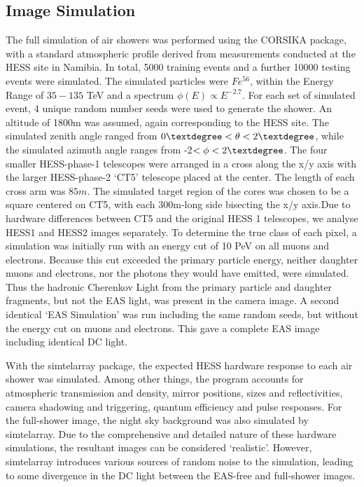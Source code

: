 \documentclass{article}
\begin{document}
\subsection{Image Simulation}
The full simulation of air showers was performed using the CORSIKA package, with a standard atmospheric profile derived from measurements conducted at the HESS site in Namibia. In total, 5000 training events and a further 10000 testing events were simulated. The simulated particles were $Fe^{56}$, within the Energy Range of $35-135$ TeV and a spectrum $\phi(E) \propto E^{-2.7}$. For each set of simulated event, 4 unique random number seeds were used to generate the shower. An altitude of 1800m was assumed, again corresponding to the HESS site. The simulated zenith angle ranged from $0\textdegree < \theta < 2 \textdegree$, while the simulated azimuth angle ranges from -2\textdegree $ < \phi < 2 \textdegree$. The four smaller HESS-phase-1 telescopes were arranged in a cross along the x/y axis with the larger HESS-phase-2 \textquoteleft CT5' telescope placed at the center. The length of each cross arm was $85m$. The simulated target region of the cores was chosen to be a square centered on CT5, with each 300m-long side bisecting the x/y axis.Due to hardware differences between CT5 and the original HESS 1 telescopes, we analyse HESS1 and HESS2 images separately. To determine the true class of each pixel, a simulation was initially run with an energy cut of 10 PeV on all muons and electrons. Because this cut exceeded the primary particle energy, neither daughter muons and electrons, nor the photons they would have emitted, were simulated. Thus the hadronic Cherenkov Light from the primary particle and daughter fragments, but not the EAS light, was present in the camera image. A second identical \textquoteleft EAS Simulation' was run including the same random seeds, but without the energy cut on muons and electrons. This gave a complete EAS image including identical DC light.

With the sim\textunderscore telarray package, the expected HESS hardware response to each air shower was simulated. Among other things, the program accounts for atmospheric transmission and density, mirror positions, sizes and reflectivities, camera shadowing and triggering, quantum efficiency and pulse responses. For the full-shower image, the night sky background was also simulated by sim\textunderscore telarray. Due to the comprehensive and detailed nature of these hardware simulations, the resultant images can be considered \textquoteleft realistic'.  However, sim\textunderscore telarray introduces various sources of random noise to the simulation, leading to some divergence in the DC light between the EAS-free and full-shower images.
\end{document}
